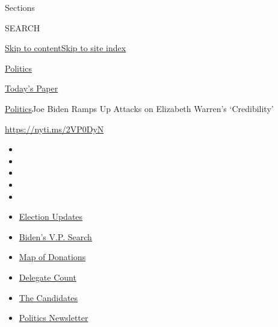 Sections

SEARCH

\protect\hyperlink{site-content}{Skip to
content}\protect\hyperlink{site-index}{Skip to site index}

\href{https://www.nytimes.com/section/politics}{Politics}

\href{https://myaccount.nytimes.com/auth/login?response_type=cookie\&client_id=vi}{}

\href{https://www.nytimes.com/section/todayspaper}{Today's Paper}

\href{/section/politics}{Politics}\textbar{}Joe Biden Ramps Up Attacks
on Elizabeth Warren's `Credibility'

\url{https://nyti.ms/2VP0DyN}

\begin{itemize}
\item
\item
\item
\item
\item
\end{itemize}

\begin{itemize}
\item
  \href{https://www.nytimes.com/2020/07/31/us/elections/biden-vs-trump.html?action=click\&pgtype=Article\&state=default\&region=TOP_BANNER\&context=storylines_menu}{Election
  Updates}
\item
  \href{https://www.nytimes.com/article/biden-vice-president-2020.html?action=click\&pgtype=Article\&state=default\&region=TOP_BANNER\&context=storylines_menu}{Biden's
  V.P. Search}
\item
  \href{https://www.nytimes.com/interactive/2020/07/24/us/politics/trump-biden-campaign-donors.html?action=click\&pgtype=Article\&state=default\&region=TOP_BANNER\&context=storylines_menu}{Map
  of Donations}
\item
  \href{https://www.nytimes.com/interactive/2020/us/elections/delegate-count-primary-results.html?action=click\&pgtype=Article\&state=default\&region=TOP_BANNER\&context=storylines_menu}{Delegate
  Count}
\item
  \href{https://www.nytimes.com/interactive/2019/us/politics/2020-presidential-candidates.html?action=click\&pgtype=Article\&state=default\&region=TOP_BANNER\&context=storylines_menu}{The
  Candidates}
\item
  \href{https://www.nytimes.com/newsletters/politics?action=click\&pgtype=Article\&state=default\&region=TOP_BANNER\&context=storylines_menu}{Politics
  Newsletter}
\end{itemize}

